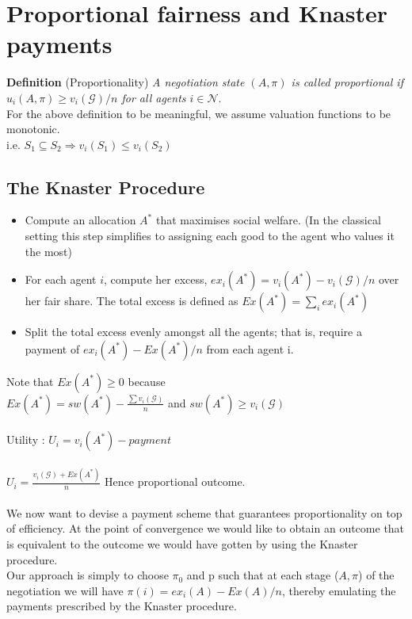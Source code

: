 \documentclass{article}
\begin{document}
\section{Proportional fairness and Knaster payments}
\textbf{Definition} (Proportionality) \textit{A negotiation state $(A, \pi)$ is called proportional if $u_{i}(A, \pi) \geq v_{i}(\mathcal{G})/n$ for all agents $i \in \mathcal{N}$}.\\
For the above definition to be meaningful, we assume valuation functions to be monotonic.\\
i.e. $S_{1} \subseteq S_{2} \Rightarrow v_{i}(S_{1}) \leq v_{i}(S_{2})$
\subsection{The Knaster Procedure}
\begin{itemize}
    \item Compute an allocation $A^*$ that maximises social welfare. (In the classical setting this step simplifies to assigning each good to the agent who values it the most)
    \item For each agent $i$, compute her excess, $ex_i(A^*) = v_i(A^*)-v_i(\mathcal{G})/n$ over her fair share. The total excess is defined as $Ex(A^*) = \sum_{i} ex_{i}(A^*)$
    \item Split the total excess evenly amongst all the agents; that is, require a payment of $ex_i(A^*)-Ex(A^*)/n$ from each agent i.
\end{itemize}
Note that $Ex(A^{*}) \geq 0 $ because\\ $Ex(A^{*}) = sw(A^{*}) - \frac{\sum v_{i}(\mathcal{G})}{n}$ and $sw(A^{*}) \geq v_{i}(\mathcal{G})$\\
\\
Utility : $U_{i} = v_{i}(A^{*}) - payment$\\
\\
$U_{i} = \frac{v_{i}(\mathcal{G})+Ex(A^{*})}{n} $
Hence proportional outcome.\\
\\
We now want to devise a payment scheme that guarantees proportionality
on top of efficiency. At the point of convergence we would like to obtain an outcome that is equivalent to
the outcome we would have gotten by using the Knaster procedure.\\
Our approach is simply to choose $\pi_{0}$ and p such that at each stage ($A, \pi$) of the
negotiation we will have $\pi(i) = ex_{i}(A) - Ex(A)/n$, thereby emulating the payments prescribed by the
Knaster procedure.
\end{document}
